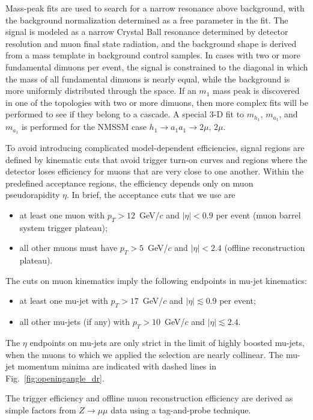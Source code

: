 \documentclass[12pt]{cms-tdr}
\begin{document}
Mass-peak fits are used to search for a narrow resonance above
background, with the background normalization determined as a free
parameter in the fit.  The signal is modeled as a narrow Crystal Ball
resonance determined by detector resolution and muon final state
radiation, and the background shape is derived from a mass template in
background control samples.  In cases with two or more fundamental
dimuons per event, the signal is constrained to the diagonal in which
the mass of all fundamental dimuons is nearly equal, while the
background is more uniformly distributed through the space.  If an
$m_1$ mass peak is discovered in one of the topologies with two or
more dimuons, then more complex fits will be performed to see if they
belong to a cascade.  A special 3-D fit to $m_{h_1}$, $m_{a_1}$, and
$m_{a_1}$ is performed for the NMSSM case $h_1 \to a_1 a_1 \to 2\mu,
\, 2\mu$.

To avoid introducing complicated model-dependent efficiencies, signal
regions are defined by kinematic cuts that avoid trigger turn-on
curves and regions where the detector loses efficiency for muons that
are very close to one another.  Within the predefined acceptance
regions, the efficiency depends only on muon pseudorapidity $\eta$.
In brief, the acceptance cuts that we use are
\begin{itemize}
\item at least one muon with $p_T > 12$~GeV/$c$ and $|\eta| < 0.9$ per
  event (muon barrel system trigger plateau);
\item all other muons must have $p_T > 5$~GeV/$c$ and $|\eta| < 2.4$
  (offline reconstruction plateau).
\end{itemize}
The cuts on muon kinematics imply the following endpoints in mu-jet kinematics:
\begin{itemize}
\item at least one mu-jet with $p_T > 17$~GeV/$c$ and $|\eta| \lesssim 0.9$ per event;
\item all other mu-jets (if any) with $p_T > 10$~GeV/$c$ and $|\eta| \lesssim 2.4$.
\end{itemize}
The $\eta$ endpoints on mu-jets are only strict in the limit of highly
boosted mu-jets, when the muons to which we applied the selection are
nearly collinear.  The mu-jet momentum minima are indicated with
dashed lines in Fig.~\ref{fig:openingangle_dr}.

The trigger efficiency and offline muon reconstruction efficiency are
derived as simple factors from $Z \to \mu\mu$ data using a
tag-and-probe technique.
\end{document}
